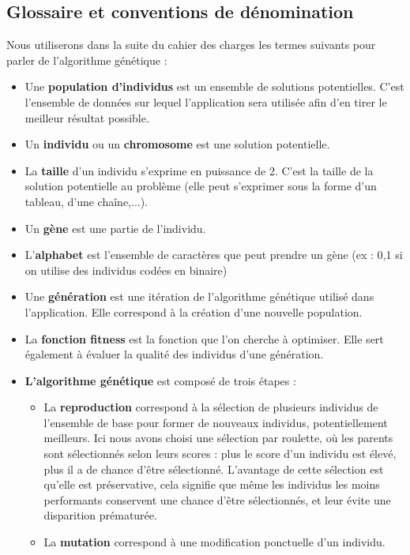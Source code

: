 \documentclass[a4paper,11pt]{article}
\begin{document}
		\subsection{Glossaire et conventions de dénomination}
			Nous utiliserons dans la suite du cahier des charges les termes suivants pour parler de l’algorithme génétique :\\
			\begin{itemize}
			\item Une \textbf{population d’individus} est un ensemble de solutions potentielles. C’est l’ensemble de données sur lequel l’application sera utilisée afin d’en tirer le meilleur résultat possible.
			\item Un \textbf{individu} ou un \textbf{chromosome} est une solution potentielle.
			\item La \textbf{taille} d’un individu s’exprime en puissance de 2. C’est la taille de la solution potentielle au problème (elle peut s’exprimer sous la forme d’un tableau, d’une chaîne,...).
			\item Un \textbf{gène}  est une partie de l'individu.
			\item L’\textbf{alphabet} est l’ensemble de caractères que peut prendre un gène (ex : {0,1} si on utilise des individus codées en binaire)
			\item Une \textbf{génération } est une itération de l’algorithme génétique utilisé dans l’application. Elle correspond à la création d'une nouvelle population. 
			\item La \textbf{fonction fitness} est la fonction que l’on cherche à optimiser. Elle sert également à évaluer la qualité des individus d'une génération.
			\item \textbf{L’algorithme génétique} est composé de trois étapes :
				\begin{itemize}
				\item La \textbf{reproduction} correspond à la sélection de plusieurs individus de l’ensemble de base pour former de nouveaux individus, potentiellement meilleurs.
				Ici nous avons choisi une sélection par roulette, où les parents sont sélectionnés selon leurs scores : plus le score d'un individu est élevé, plus il a de chance d'être sélectionné.
				L'avantage de cette sélection est qu'elle est préservative, cela signifie que même les individus les moins performants conservent une chance d’être sélectionnés, et leur évite une disparition prématurée. 
				\item La \textbf{mutation} correspond à une modification ponctuelle d’un individu.

\end{itemize}
\end{itemize}
\end{document}
